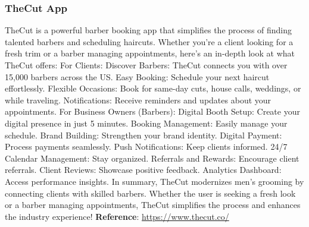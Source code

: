\documentclass{article}
\begin{document}
      \subsubsection{TheCut App}
      TheCut is a powerful barber booking app that simplifies the process of finding talented barbers and scheduling haircuts. Whether you’re a client looking for a fresh trim or a barber managing appointments, here’s an in-depth look at what TheCut offers: For Clients:
      Discover Barbers: TheCut connects you with over 15,000 barbers across the US.
      Easy Booking: Schedule your next haircut effortlessly.
      Flexible Occasions: Book for same-day cuts, house calls, weddings, or while traveling.
      Notifications: Receive reminders and updates about your appointments.
      For Business Owners (Barbers):
      Digital Booth Setup: Create your digital presence in just 5 minutes.
      Booking Management: Easily manage your schedule.
      Brand Building: Strengthen your brand identity.
      Digital Payment: Process payments seamlessly.
      Push Notifications: Keep clients informed.
      24/7 Calendar Management: Stay organized.
      Referrals and Rewards: Encourage client referrals.
      Client Reviews: Showcase positive feedback.
      Analytics Dashboard: Access performance insights.
      In summary, TheCut modernizes men’s grooming by connecting clients with skilled barbers. Whether the user is seeking a fresh look or a barber managing appointments, TheCut simplifies the process and enhances the industry experience!\newline
      \textbf{Reference}: \href{https://www.thecut.co/}{https://www.thecut.co/}
\end{document}
